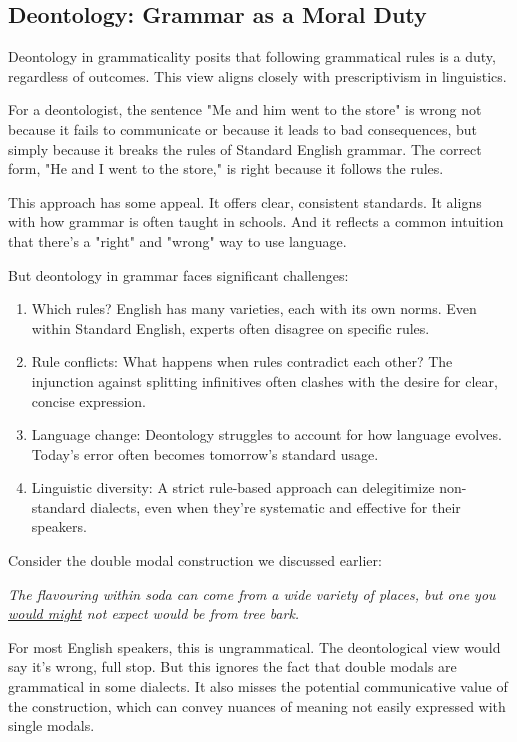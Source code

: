 \subsection{Deontology: Grammar as a Moral Duty}

Deontology in grammaticality posits that following grammatical rules is a duty, regardless of outcomes. This view aligns closely with prescriptivism in linguistics.

For a deontologist, the sentence "Me and him went to the store" is wrong not because it fails to communicate or because it leads to bad consequences, but simply because it breaks the rules of Standard English grammar. The correct form, "He and I went to the store," is right because it follows the rules.

This approach has some appeal. It offers clear, consistent standards. It aligns with how grammar is often taught in schools. And it reflects a common intuition that there's a "right" and "wrong" way to use language.

But deontology in grammar faces significant challenges:

\begin{enumerate}
    \item Which rules? English has many varieties, each with its own norms. Even within Standard English, experts often disagree on specific rules.
    
    \item Rule conflicts: What happens when rules contradict each other? The injunction against splitting infinitives often clashes with the desire for clear, concise expression.
    
    \item Language change: Deontology struggles to account for how language evolves. Today's error often becomes tomorrow's standard usage.
    
    \item Linguistic diversity: A strict rule-based approach can delegitimize non-standard dialects, even when they're systematic and effective for their speakers.
\end{enumerate}

Consider the double modal construction we discussed earlier:

\ea \textit{The flavouring within soda can come from a wide variety of places, but one you \uline{would might} not expect would be from tree bark.}
\z

For most English speakers, this is ungrammatical. The deontological view would say it's wrong, full stop. But this ignores the fact that double modals are grammatical in some dialects. It also misses the potential communicative value of the construction, which can convey nuances of meaning not easily expressed with single modals.

